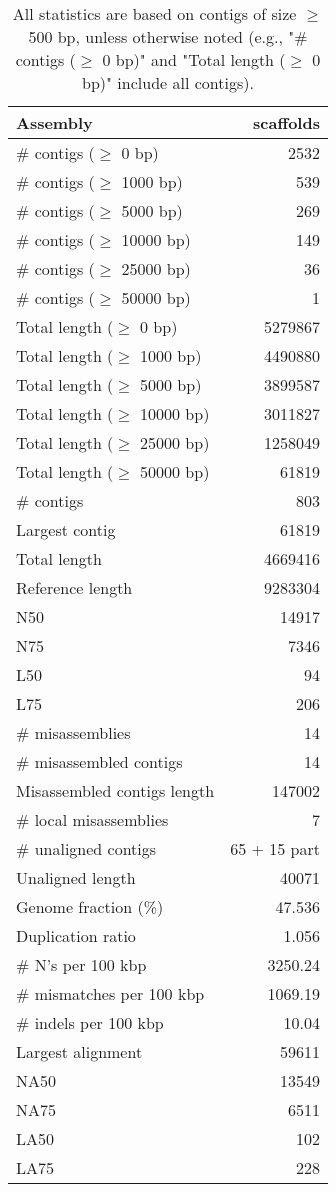\documentclass[12pt,a4paper]{article}
\begin{document}
\begin{table}[ht]
\begin{center}
\caption{All statistics are based on contigs of size $\geq$ 500 bp, unless otherwise noted (e.g., "\# contigs ($\geq$ 0 bp)" and "Total length ($\geq$ 0 bp)" include all contigs).}
\begin{tabular}{|l*{1}{|r}|}
\hline
Assembly & scaffolds \\ \hline
\# contigs ($\geq$ 0 bp) & 2532 \\ \hline
\# contigs ($\geq$ 1000 bp) & 539 \\ \hline
\# contigs ($\geq$ 5000 bp) & 269 \\ \hline
\# contigs ($\geq$ 10000 bp) & 149 \\ \hline
\# contigs ($\geq$ 25000 bp) & 36 \\ \hline
\# contigs ($\geq$ 50000 bp) & 1 \\ \hline
Total length ($\geq$ 0 bp) & 5279867 \\ \hline
Total length ($\geq$ 1000 bp) & 4490880 \\ \hline
Total length ($\geq$ 5000 bp) & 3899587 \\ \hline
Total length ($\geq$ 10000 bp) & 3011827 \\ \hline
Total length ($\geq$ 25000 bp) & 1258049 \\ \hline
Total length ($\geq$ 50000 bp) & 61819 \\ \hline
\# contigs & 803 \\ \hline
Largest contig & 61819 \\ \hline
Total length & 4669416 \\ \hline
Reference length & 9283304 \\ \hline
N50 & 14917 \\ \hline
N75 & 7346 \\ \hline
L50 & 94 \\ \hline
L75 & 206 \\ \hline
\# misassemblies & 14 \\ \hline
\# misassembled contigs & 14 \\ \hline
Misassembled contigs length & 147002 \\ \hline
\# local misassemblies & 7 \\ \hline
\# unaligned contigs & 65 + 15 part \\ \hline
Unaligned length & 40071 \\ \hline
Genome fraction (\%) & 47.536 \\ \hline
Duplication ratio & 1.056 \\ \hline
\# N's per 100 kbp & 3250.24 \\ \hline
\# mismatches per 100 kbp & 1069.19 \\ \hline
\# indels per 100 kbp & 10.04 \\ \hline
Largest alignment & 59611 \\ \hline
NA50 & 13549 \\ \hline
NA75 & 6511 \\ \hline
LA50 & 102 \\ \hline
LA75 & 228 \\ \hline
\end{tabular}
\end{center}
\end{table}
\end{document}
